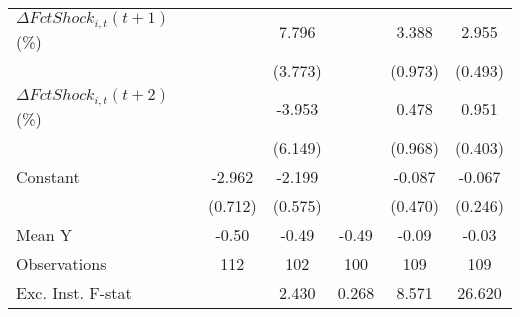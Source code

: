 {\begin{tabular}{l*{5}{c}}
\addlinespace
$ \Delta FctShock_{i,t}(t+1)$ (\%)&                     &       7.796\sym{*}  &                     &       3.388\sym{***}&       2.955\sym{***}\\
                    &                     &     (3.773)         &                     &     (0.973)         &     (0.493)         \\
\addlinespace
$ \Delta FctShock_{i,t}(t+2)$ (\%)&                     &      -3.953         &                     &       0.478         &       0.951\sym{**} \\
                    &                     &     (6.149)         &                     &     (0.968)         &     (0.403)         \\
\addlinespace
Constant            &      -2.962\sym{***}&      -2.199\sym{***}&                     &      -0.087         &      -0.067         \\
                    &     (0.712)         &     (0.575)         &                     &     (0.470)         &     (0.246)         \\
\midrule
Mean Y              &       -0.50         &       -0.49         &       -0.49         &       -0.09         &       -0.03         \\
Observations        &         112         &         102         &         100         &         109         &         109         \\
Exc. Inst. F-stat   &                     &       2.430         &       0.268         &       8.571         &      26.620         \\
\bottomrule
\end{tabular}
}
